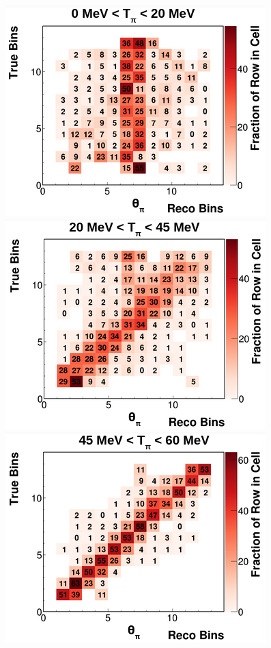 \begin{figure}[!htb]
    \centering
    \includegraphics[scale=0.33]{Figures/Chapter4/SignalDefinition/thetapi0to20tpi.png}
    \includegraphics[scale=0.33]{Figures/Chapter4/SignalDefinition/thetapi20to45tpi.png}
    \includegraphics[scale=0.33]{Figures/Chapter4/SignalDefinition/thetapi45to60tpi.png}

\end{figure}
